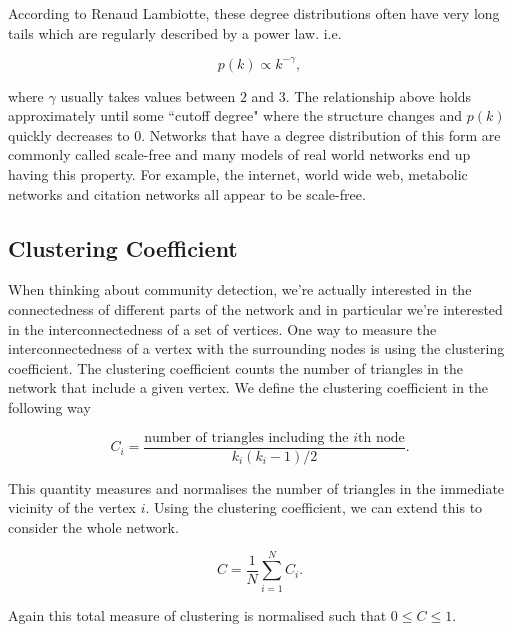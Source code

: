 According to Renaud Lambiotte, these degree distributions often have very long tails which are regularly described by a power law. i.e.

$$ p(k) \propto k^{-\gamma}, $$

where $\gamma$ usually takes values between $2$ and $3$\cite[16]{oxford:renaud_notes}. The relationship above holds approximately until some ``cutoff degree" where the structure changes and $p(k)$ quickly decreases to $0$. Networks that have a degree distribution of this form are commonly called scale-free and many models of real world networks end up having this property. For example, the internet\cite{PhysRevE.65.066130}, world wide web\cite{BARABASI200069}, metabolic networks\cite{Jeong2000} and citation networks\cite{Redner1998} all appear to be scale-free.

\subsection{Clustering Coefficient}
When thinking about community detection, we're actually interested in the connectedness of different parts of the network and in particular we're interested in the interconnectedness of a set of vertices. One way to measure the interconnectedness of a vertex with the surrounding nodes is using the clustering coefficient. The clustering coefficient counts the number of triangles in the network that include a given vertex. We define the clustering coefficient in the following way

$$ C_i = \frac{\text{number of triangles including the }i\text{th node}}{k_i(k_i-1)/2}. $$

This quantity measures and normalises the number of triangles in the immediate vicinity of the vertex $i$. Using the clustering coefficient, we can extend this to consider the whole network.

$$ C = \frac{1}{N}\sum_{i=1}^NC_i. $$

Again this total measure of clustering is normalised such that $0 \leq C \leq 1$.

